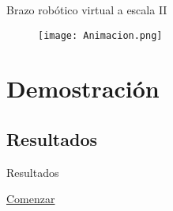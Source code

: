 \documentclass[xcolor = {dvipsnames, table}]{beamer}
\begin{document}
\begin{frame}{Brazo robótico virtual a escala II}
  \begin{figure}
    \centering
    \texttt{[image: Animacion.png]}
  \end{figure}
\end{frame}


\section{Demostración}

\subsection{Resultados}

\begin{frame}{Resultados}
  \begin{center}
    \href{https://alvarezrosa.com/proyecto/}{Comenzar}
  \end{center}
\end{frame}
\end{document}
